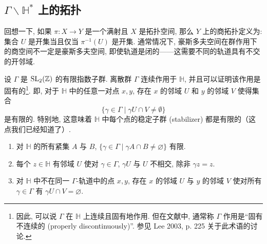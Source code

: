 \begin{center}
\end{center}

\subsection*{$\Gamma \backslash \mathbb{H}^*$ 上的拓扑}

回想一下, 如果 $\pi: X \to Y$ 是一个满射且 $X$ 是拓扑空间, 那么 $Y$ 上的商拓扑定义为: 集合 $U$ 是开集当且仅当 $\pi^{-1}(U)$ 是开集. 通常情况下, 豪斯多夫空间在群作用下的商空间不一定是豪斯多夫空间, 即使轨道是闭的——这需要不同的轨道具有不交的开邻域. 

设 $\Gamma$ 是 $\operatorname{SL}_2(\mathbb{Z})$ 的有限指数子群. 离散群 $\Gamma$ 连续作用于 $\mathbb{H}$, 并且可以证明该作用是固有的\footnote{因此, 可以说 $\Gamma$ 在 $\mathbb{H}$ 上连续且固有地作用. 但在文献中, 通常称 $\Gamma$ 作用是“固有不连续的 (properly discontinuously)”. 参见 Lee 2003, p. 225 关于此术语的讨论. }. 即, 对于 $\mathbb{H}$ 中的任意一对点 $x, y$, 存在 $x$ 的邻域 $U$ 和 $y$ 的邻域 $V$ 使得集合
\[ \{ \gamma \in \Gamma \mid \gamma U \cap V \neq \emptyset \} \]
是有限的. 特别地, 这意味着 $\mathbb{H}$ 中每个点的稳定子群 (stabilizer) 都是有限的（这点我们已经知道了）. 


\begin{proposition} \label{thm:5.1.5}
\begin{enumerate}[label=\textup{(\alph*)}]
\item 对 $\mathbb{H}$ 的所有紧集 $A$ 与 $B$, $\{\gamma\in\Gamma \mid \gamma A\cap B\neq\varnothing\}$ 有限.
\item 每个 $z\in\mathbb{H}$ 有邻域 $U$ 使对 $\gamma\in\Gamma$, $\gamma U$ 与 $U$ 不相交, 除非 $\gamma z = z$.
\item 对 $\mathbb{H}$ 中不在同一 $\Gamma$-轨道中的点 $x, y$, 存在 $x$ 的邻域 $U$ 与 $y$ 的邻域 $V$ 使对所有 $\gamma\in\Gamma$ 有 $\gamma U\cap V = \varnothing$.
\end{enumerate}
\end{proposition}


